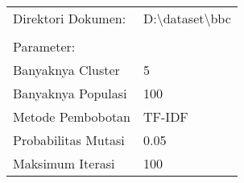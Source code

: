 \begin{table}[H]
\begin{tabular}{lllll}
Direktori Dokumen:                                 & \multicolumn{4}{l}{D:\textbackslash{}dataset\textbackslash{}bbc} \\
                                                   &                                                                &                                                       &                                                        &                                                       \\
Parameter:                                         &                                                                &                                                       &                                                        &                                                       \\ \cline{1-2}
\multicolumn{1}{|l|}{Banyaknya Cluster}            & \multicolumn{1}{l|}{5}                                         &                                                       &                                                        &                                                       \\ \cline{1-2}
\multicolumn{1}{|l|}{Banyaknya Populasi}           & \multicolumn{1}{l|}{100}                                       &                                                       &                                                        &                                                       \\ \cline{1-2}
\multicolumn{1}{|l|}{Metode Pembobotan}            & \multicolumn{1}{l|}{TF-IDF}                                    &                                                       &                                                        &                                                       \\ \cline{1-2}
\multicolumn{1}{|l|}{Probabilitas Mutasi}          & \multicolumn{1}{l|}{0.05}                                      &                                                       &                                                        &                                                       \\ \cline{1-2}
\multicolumn{1}{|l|}{Maksimum Iterasi}             & \multicolumn{1}{l|}{100}                                       &                                                       &                                                        &                                                       \\ \cline{1-2}

\end{tabular}
\end{table}
